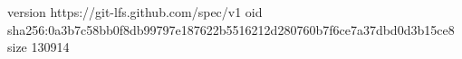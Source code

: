 version https://git-lfs.github.com/spec/v1
oid sha256:0a3b7c58bb0f8db99797e187622b5516212d280760b7f6ce7a37dbd0d3b15ce8
size 130914
